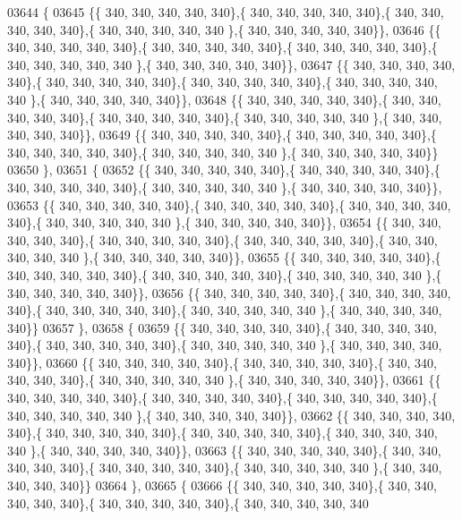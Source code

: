 \begin{DoxyCode}
03644 \{
03645 \{\{ 340, 340, 340, 340, 340\},\{ 340, 340, 340, 340, 340\},\{ 340, 340, 340, 340, 340\},\{ 340, 340, 340, 340, 340
      \},\{ 340, 340, 340, 340, 340\}\},
03646 \{\{ 340, 340, 340, 340, 340\},\{ 340, 340, 340, 340, 340\},\{ 340, 340, 340, 340, 340\},\{ 340, 340, 340, 340, 340
      \},\{ 340, 340, 340, 340, 340\}\},
03647 \{\{ 340, 340, 340, 340, 340\},\{ 340, 340, 340, 340, 340\},\{ 340, 340, 340, 340, 340\},\{ 340, 340, 340, 340, 340
      \},\{ 340, 340, 340, 340, 340\}\},
03648 \{\{ 340, 340, 340, 340, 340\},\{ 340, 340, 340, 340, 340\},\{ 340, 340, 340, 340, 340\},\{ 340, 340, 340, 340, 340
      \},\{ 340, 340, 340, 340, 340\}\},
03649 \{\{ 340, 340, 340, 340, 340\},\{ 340, 340, 340, 340, 340\},\{ 340, 340, 340, 340, 340\},\{ 340, 340, 340, 340, 340
      \},\{ 340, 340, 340, 340, 340\}\}
03650 \},
03651 \{
03652 \{\{ 340, 340, 340, 340, 340\},\{ 340, 340, 340, 340, 340\},\{ 340, 340, 340, 340, 340\},\{ 340, 340, 340, 340, 340
      \},\{ 340, 340, 340, 340, 340\}\},
03653 \{\{ 340, 340, 340, 340, 340\},\{ 340, 340, 340, 340, 340\},\{ 340, 340, 340, 340, 340\},\{ 340, 340, 340, 340, 340
      \},\{ 340, 340, 340, 340, 340\}\},
03654 \{\{ 340, 340, 340, 340, 340\},\{ 340, 340, 340, 340, 340\},\{ 340, 340, 340, 340, 340\},\{ 340, 340, 340, 340, 340
      \},\{ 340, 340, 340, 340, 340\}\},
03655 \{\{ 340, 340, 340, 340, 340\},\{ 340, 340, 340, 340, 340\},\{ 340, 340, 340, 340, 340\},\{ 340, 340, 340, 340, 340
      \},\{ 340, 340, 340, 340, 340\}\},
03656 \{\{ 340, 340, 340, 340, 340\},\{ 340, 340, 340, 340, 340\},\{ 340, 340, 340, 340, 340\},\{ 340, 340, 340, 340, 340
      \},\{ 340, 340, 340, 340, 340\}\}
03657 \},
03658 \{
03659 \{\{ 340, 340, 340, 340, 340\},\{ 340, 340, 340, 340, 340\},\{ 340, 340, 340, 340, 340\},\{ 340, 340, 340, 340, 340
      \},\{ 340, 340, 340, 340, 340\}\},
03660 \{\{ 340, 340, 340, 340, 340\},\{ 340, 340, 340, 340, 340\},\{ 340, 340, 340, 340, 340\},\{ 340, 340, 340, 340, 340
      \},\{ 340, 340, 340, 340, 340\}\},
03661 \{\{ 340, 340, 340, 340, 340\},\{ 340, 340, 340, 340, 340\},\{ 340, 340, 340, 340, 340\},\{ 340, 340, 340, 340, 340
      \},\{ 340, 340, 340, 340, 340\}\},
03662 \{\{ 340, 340, 340, 340, 340\},\{ 340, 340, 340, 340, 340\},\{ 340, 340, 340, 340, 340\},\{ 340, 340, 340, 340, 340
      \},\{ 340, 340, 340, 340, 340\}\},
03663 \{\{ 340, 340, 340, 340, 340\},\{ 340, 340, 340, 340, 340\},\{ 340, 340, 340, 340, 340\},\{ 340, 340, 340, 340, 340
      \},\{ 340, 340, 340, 340, 340\}\}
03664 \},
03665 \{
03666 \{\{ 340, 340, 340, 340, 340\},\{ 340, 340, 340, 340, 340\},\{ 340, 340, 340, 340, 340\},\{ 340, 340, 340, 340, 340

\end{DoxyCode}
